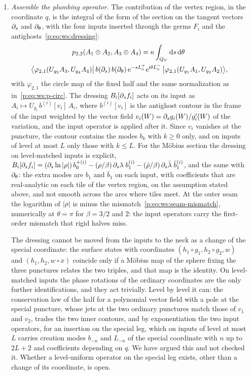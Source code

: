 \begin{enumerate}
  \item \emph{Assemble the plumbing operator.}
    The contribution of the vertex region, in the coordinate $q$, is the integral of the form of the section on the tangent vectors $\partial_s$ and $\partial_\theta$, with the four inputs inserted through the germs $F_i$ and the antighosts~\eqref{p:eq:ws:dressing}:
    \begin{multline}
      \label{p:eq:ws:recipe-plumbing}
      p_{2,2}(A_1 \otimes A_2, A_3 \otimes A_4)
        = \kappa \int_{Q_V} \mathrm{d} s \, \mathrm{d}\theta \;
      \\
          \big\langle \varphi_{2,1}(U_{g_3} A_3, U_{g_4} A_4) \big| \, b(\partial_s) \, b(\partial_\theta) \, \mathrm{e}^{- s L_0^+} \mathrm{e}^{\mathrm{i} \theta L_0^-} \, \big| \varphi_{2,1}(U_{g_1} A_1, U_{g_2} A_2) \big\rangle,
    \end{multline}
    with $\varphi_{2,1}$ the circle map of the fixed half and the same normalization as in~\eqref{p:eq:ws:p-circ}.
    The dressing $B_i[\partial_s f_i]$ acts on its input as $A_i \mapsto U_{g_i} \, b^{(i)}[v_i] \, A_i$, where $b^{(i)}[v_i]$ is the antighost contour in the frame of the input weighted by the vector field $v_i(W) = \partial_s g_i(W) / g_i'(W)$ of the variation, and the input operator is applied after it.
    Since $v_i$ vanishes at the puncture, the contour contains the modes $b_k$ with $k \geq 0$ only, and on inputs of level at most $L$ only those with $k \leq L$.
    For the Möbius section the dressing on level-matched inputs is explicit, $B_i[\partial_s f_i] = (\partial_s \ln {|\rho|}) \, b_0^{+ (i)} - (\rho / \beta) \, \partial_s \lambda \; b_1^{(i)} - (\bar\rho / \beta) \, \partial_s \bar\lambda \; \bar b_1^{(i)}$, and the same with $\partial_\theta$: the extra modes are $b_1$ and $\bar b_1$ on each input, with coefficients that are real-analytic on each tile of the vertex region, on the assumption stated above, and not smooth across the arcs where tiles meet.
    At the outer seam the logarithm of ${|\rho|}$ is minus the mismatch~\eqref{p:eq:ws:seam-mismatch}, numerically at $\theta = \pi$ for $\beta = 3 / 2$ and $2$: the input operators carry the first-order mismatch that rigid halves miss.

    The dressing cannot be moved from the inputs to the neck as a change of the special coordinate: the surface states with coordinates $(h_1 \circ g_1, h_2 \circ g_2, w)$ and $(h_1, h_2, w \circ x)$ coincide only if a Möbius map of the sphere fixing the three punctures relates the two triples, and that map is the identity.
    On level-matched inputs the phase rotations of the ordinary coordinates are the only further identifications, and they act trivially.
    Level by level it can: the conservation law of the half for a polynomial vector field with a pole at the special puncture, whose jets at the two ordinary punctures match those of $v_1$ and $v_2$, trades the two inner contours, and by exponentiation the two input operators, for an insertion on the special leg, which on inputs of level at most $L$ carries creation modes $b_{-n}$ and $L_{-n}$ of the special coordinate with $n$ up to $2 L + 2$ and coefficients depending on $q$.
    We have argued this and not checked it.
    Whether a level-uniform operator on the special leg exists, other than a change of its coordinate, is open.


\end{enumerate}
